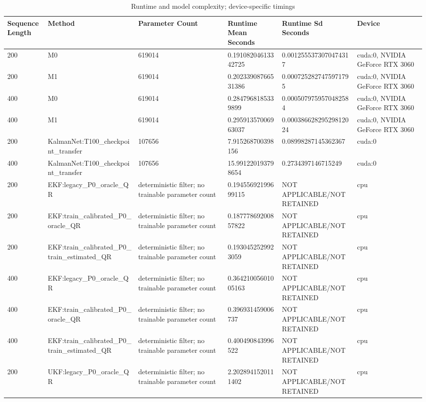 \begin{table}[t]
\centering
\caption{Runtime and model complexity; device-specific timings}
\label{tab:runtime}
\scriptsize
\begin{tabular}{llllll}
\hline
Sequence Length & Method & Parameter Count & Runtime Mean Seconds & Runtime Sd Seconds & Device \\
\hline
200 & M0 & 619014 & 0.19108204613342725 & 0.0012555373070474317 & cuda:0, NVIDIA GeForce RTX 3060 \\
200 & M1 & 619014 & 0.20233908766531386 & 0.0007252827475971795 & cuda:0, NVIDIA GeForce RTX 3060 \\
400 & M0 & 619014 & 0.2847968185339899 & 0.0005079759570482584 & cuda:0, NVIDIA GeForce RTX 3060 \\
400 & M1 & 619014 & 0.29591357006963037 & 0.00038662829529812024 & cuda:0, NVIDIA GeForce RTX 3060 \\
200 & KalmanNet:T100\_checkpoint\_transfer & 107656 & 7.915268700398156 & 0.08998287145362367 & cuda:0 \\
400 & KalmanNet:T100\_checkpoint\_transfer & 107656 & 15.991220193798654 & 0.2734397146715249 & cuda:0 \\
200 & EKF:legacy\_P0\_oracle\_QR & deterministic filter; no trainable parameter count & 0.19455692199699115 & NOT APPLICABLE/NOT RETAINED & cpu \\
200 & EKF:train\_calibrated\_P0\_oracle\_QR & deterministic filter; no trainable parameter count & 0.18777869200857822 & NOT APPLICABLE/NOT RETAINED & cpu \\
200 & EKF:train\_calibrated\_P0\_train\_estimated\_QR & deterministic filter; no trainable parameter count & 0.1930452529923059 & NOT APPLICABLE/NOT RETAINED & cpu \\
400 & EKF:legacy\_P0\_oracle\_QR & deterministic filter; no trainable parameter count & 0.36421005601005163 & NOT APPLICABLE/NOT RETAINED & cpu \\
400 & EKF:train\_calibrated\_P0\_oracle\_QR & deterministic filter; no trainable parameter count & 0.396931459006737 & NOT APPLICABLE/NOT RETAINED & cpu \\
400 & EKF:train\_calibrated\_P0\_train\_estimated\_QR & deterministic filter; no trainable parameter count & 0.400490843996522 & NOT APPLICABLE/NOT RETAINED & cpu \\
200 & UKF:legacy\_P0\_oracle\_QR & deterministic filter; no trainable parameter count & 2.2028941520111402 & NOT APPLICABLE/NOT RETAINED & cpu \\

\end{tabular}
\end{table}
